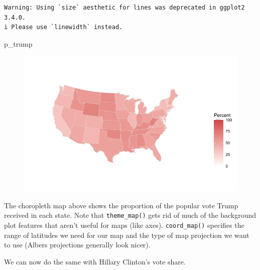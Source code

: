 \documentclass[
  letterpaper,
]{book}
\newenvironment{Shaded}{\begin{snugshade}}{\end{snugshade}}
\newcommand{\NormalTok}[1]{\textcolor[rgb]{0.00,0.23,0.31}{#1}}
\begin{document}
\begin{verbatim}
Warning: Using `size` aesthetic for lines was deprecated in ggplot2 3.4.0.
i Please use `linewidth` instead.
\end{verbatim}

\begin{Shaded}
\begin{Highlighting}[]
\NormalTok{p\_trump}
\end{Highlighting}
\end{Shaded}

\begin{figure}[H]

{\centering \includegraphics{scraping-and-maps_files/figure-pdf/unnamed-chunk-21-1.pdf}

}

\end{figure}

The choropleth map above shows the proportion of the popular vote Trump
received in each state. Note that \texttt{theme\_map()} gets rid of much
of the background plot features that aren't useful for maps (like axes).
\texttt{coord\_map()} specifies the range of latitudes we need for our
map and the type of map projection we want to use (Albers projections
generally look nicer).

We can now do the same with Hillary Clinton's vote share.
\end{document}

